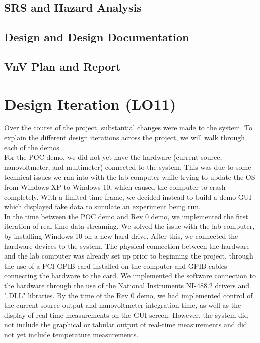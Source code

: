 \documentclass{article}
\begin{document}
\subsection{SRS and Hazard Analysis}



\subsection{Design and Design Documentation}

\subsection{VnV Plan and Report}

\section{Design Iteration (LO11)}


\noindent Over the course of the project, substantial changes were made to the system. To explain the different design iterations across the project, we will walk through each of the demos. \\ 

\noindent For the POC demo, we did not yet have the hardware (current source, nanovoltmeter, and multimeter) connected to the system. This was due to some technical issues we ran into with the lab computer while trying to update the OS from Windows XP to Windows 10, which caused the computer to crash completely. With a limited time frame, we decided instead to build a demo GUI which displayed fake data to simulate an experiment being run. \\

\noindent In the time between the POC demo and Rev 0 demo, we implemented the first iteration of real-time data streaming. We solved the issue with the lab computer, by installing Windows 10 on a new hard drive. After this, we connected the hardware devices to the system. The physical connection between the hardware and the lab computer was already set up prior to beginning the project, through the use of a PCI-GPIB card installed on the computer and GPIB cables connecting the hardware to the card. We implemented the software connection to the hardware through the use of the National Instruments NI-488.2 drivers and ".DLL" libraries. By the time of the Rev 0 demo, we had implemented control of the current source output and nanovoltmeter integration time, as well as the display of real-time measurements on the GUI screen. However, the system did not include the graphical or tabular output of real-time measurements and did not yet include temperature measurements. \\
\end{document}
